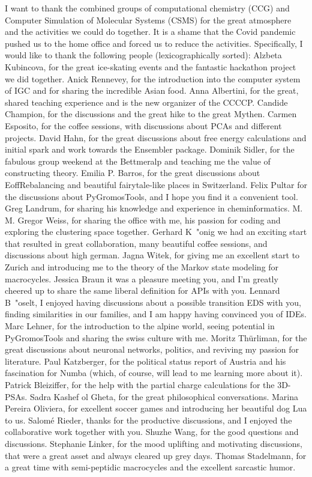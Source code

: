 I want to thank the combined groups of computational chemistry (CCG) and Computer Simulation of Molecular Systems (CSMS) for the great atmosphere and the activities we could do together. It is a shame that the Covid pandemic pushed us to the home office and forced us to reduce the activities.
Specifically, I would like to thank the following people (lexicographically sorted):
Alzbeta Kubincova, for the great ice-skating events and the fantastic hackathon project we did together.
Anick Rennevey, for the introduction into the computer system of IGC and for sharing the incredible Asian food.
Anna Albertini, for the great, shared teaching experience and is the new organizer of the CCCCP.
Candide Champion,  for the discussions and the great hike to the great Mythen.
Carmen Esposito, for the coffee sessions, with discussions about PCAs and different projects.
David Hahn, for the great discussions about free energy calculations and initial spark and work towards the Ensembler package.
Dominik Sidler, for the fabulous group weekend at the Bettmeralp and teaching me the value of constructing theory.
Emilia P. Barros, for the great discussions about EoffRebalancing and beautiful fairytale-like places in Switzerland.
Felix Pultar for the discussions about PyGromosTools, and I hope you find it a convenient tool.
Greg Landrum, for sharing his knowledge and experience in cheminformatics.
M. M. Gregor Weiss, for sharing the office with me, his passion for coding and exploring the clustering space together.
Gerhard K{\ "o}nig we had an exciting start that resulted in great collaboration, many beautiful coffee sessions, and discussions about high german.
Jagna Witek, for giving me an excellent start to Zurich and introducing me to the theory of the Markov state modeling for macrocycles.
Jessica Braun it was a pleasure meeting you, and I'm greatly cheered up to share the same liberal definition for APIs with you.
Lennard B{\ "o}selt, I enjoyed having discussions about a possible transition EDS with you, finding similarities in our families, and I am happy having convinced you of IDEs.
Marc Lehner, for the introduction to the alpine world, seeing potential in PyGromosTools and sharing the swiss culture with me.
Moritz Th{\"u}rliman, for the great discussions about neuronal networks, politics, and reviving my passion for literature.
Paul Katzberger, for the political status report of Austria and his fascination for Numba (which, of course, will lead to me learning more about it).
Patrick Bleiziffer, for the help with the partial charge calculations for the 3D-PSAs.
Sadra Kashef ol Gheta, for the great philosophical conversations.
Marina Pereira Oliviera, for excellent soccer games and introducing her beautiful dog Lua to us.
Salom{\' e} Rieder, thanks for the productive discussions, and I enjoyed the collaborative work together with you.
Shuzhe Wang, for the good questions and discussions.
Stephanie Linker, for the mood uplifting and motivating discussions, that were a great asset and always cleared up grey days.
Thomas Stadelmann, for a great time with semi-peptidic macrocycles and the excellent sarcastic humor.



